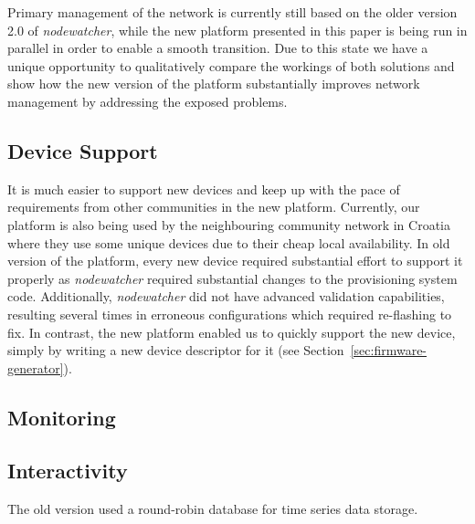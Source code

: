 \documentclass[5p,sort&compress]{elsarticle}
\newcommand{\nodewatcher}{\textit{nodewatcher}}
\begin{document}
Primary management of the network is currently still based on the older version 2.0 of \nodewatcher{}, while the new platform presented in this paper is being run in parallel in order to enable a smooth transition.
Due to this state we have a unique opportunity to qualitatively compare the workings of both solutions and show how the new version of the platform substantially improves network management by addressing the exposed problems.

\subsection{Device Support}

It is much easier to support new devices and keep up with the pace of requirements from other communities in the new platform.
Currently, our platform is also being used by the neighbouring community network in Croatia where they use some unique devices due to their cheap local availability.
In old version of the platform, every new device required substantial effort to support it properly as \nodewatcher{} required substantial changes to the provisioning system code.
Additionally, \nodewatcher{} did not have advanced validation capabilities, resulting several times in erroneous configurations which required re-flashing to fix.
In contrast, the new platform enabled us to quickly support the new device, simply by writing a new device descriptor for it (see Section~\ref{sec:firmware-generator}).

\subsection{Monitoring}


\subsection{Interactivity}

The old version used a round-robin database for time series data storage.
\end{document}
